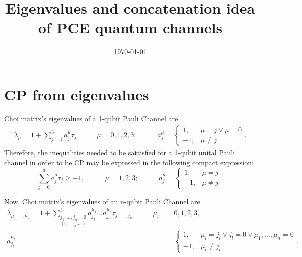 \documentclass[11pt,dvipsnames]{article} %
\newcommand{\1}{\mathds{1}}
\begin{document}
\title{Eigenvalues and concatenation idea of PCE quantum channels} 
\date{\today}  
\maketitle
\section*{CP from eigenvalues} %
Choi matrix's eigenvalues of a 1-qubit Pauli Channel are
\begin{align}
\lambda_{\mu}=1+\sum_{j=1}^3a_j^{\mu}\tau_j
\hspace{35pt}
\mu=0,1,2,3;
\hspace{35pt}
a_j^{\mu}=\left\{ \begin{array}{rl}
             1, & \mu=j \lor \mu=0\\
             -1, & \mu\neq j
             \end{array}
   \right..
\end{align}
Therefore, the inequalities needed to be sattisfied for a 1-qubit 
unital Pauli channel in order to be CP may be expressed in the 
following compact expression:
\begin{equation}
\sum_{j=0}^3a_j^{\mu}\tau_j\geq -1,
\hspace{35pt}
\mu=1,2,3;
\hspace{35pt}
a_j^{\mu}=\left\{ \begin{array}{rl}
             1, & \mu=j\\
             -1, & \mu\neq j
             \end{array}
   \right..
\end{equation}

Now, Choi matrix's eigenvalues of an n-qubit Pauli Channel are
\begin{align}\label{eq:eigvals-PCE}
\lambda_{\mu_1,\ldots,\mu_n}=1+
\sum_{\underset{(j_1,\ldots,j_n\neq0)}{j_1,\ldots,j_n=0}}^3
a_{j_1}^{\mu_1}\ldots a_{j_n}^{\mu_n}\tau_{j_1,\ldots,j_n}
\hspace{35pt}
\mu_l&=0,1,2,3,\nonumber\\
a_{j_l}^{\mu_l}&=\left\{ \begin{array}{rl}
             1, & \mu_l=j_l \lor j_l=0\lor \mu_1,\ldots,\mu_n=0\\
             -1, & \mu_l\neq j_l
             \end{array}
   \right..
\end{align}
\end{document}
